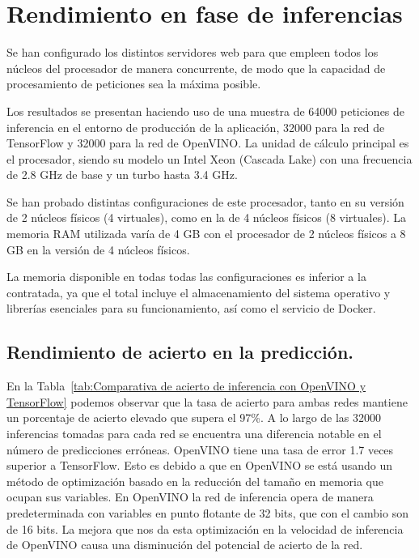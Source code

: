 \section{Rendimiento en fase de inferencias}\label{sec:ren-dimiento-en-fase-de-inferencias}
Se han configurado los distintos servidores web para que empleen todos los núcleos del procesador de manera concurrente, de modo que la capacidad de procesamiento de peticiones sea la máxima posible.

Los resultados se presentan haciendo uso de una muestra de 64000 peticiones de inferencia en el entorno de producción de la aplicación, 32000 para la red de TensorFlow y 32000 para la red de OpenVINO.
La unidad de cálculo principal es el procesador, siendo su modelo un Intel Xeon (Cascada Lake) con una frecuencia de 2.8 GHz de base y un turbo hasta 3.4 GHz.

Se han probado distintas configuraciones de este procesador, tanto en su versión de 2 núcleos físicos (4 virtuales), como en la de 4 núcleos físicos (8 virtuales).
La memoria RAM utilizada varía de 4 GB con el procesador de 2 núcleos físicos a 8 GB en la versión de 4 núcleos físicos.

La memoria disponible en todas todas las configuraciones es inferior a la contratada, ya que el total incluye el almacenamiento del sistema operativo y librerías esenciales para su funcionamiento, así como el servicio de Docker.

\subsection{Rendimiento de acierto en la predicción.}
En la Tabla~\ref{tab:Comparativa de acierto de inferencia con OpenVINO y TensorFlow} podemos observar que la tasa de acierto para ambas redes
mantiene un porcentaje de acierto elevado que supera el 97\%. A lo largo de las 32000 inferencias tomadas para cada red se encuentra una diferencia notable en el número de predicciones erróneas. OpenVINO tiene una tasa de error 1.7 veces superior a TensorFlow. Esto es debido a que en OpenVINO se está usando un método de optimización basado en la reducción del tamaño en memoria que ocupan sus variables. En OpenVINO la red de inferencia opera de manera predeterminada con variables en punto flotante de 32 bits, que con el cambio son de 16 bits.
La mejora que nos da esta optimización en la velocidad de inferencia de OpenVINO causa una disminución del potencial de acierto de la red.


